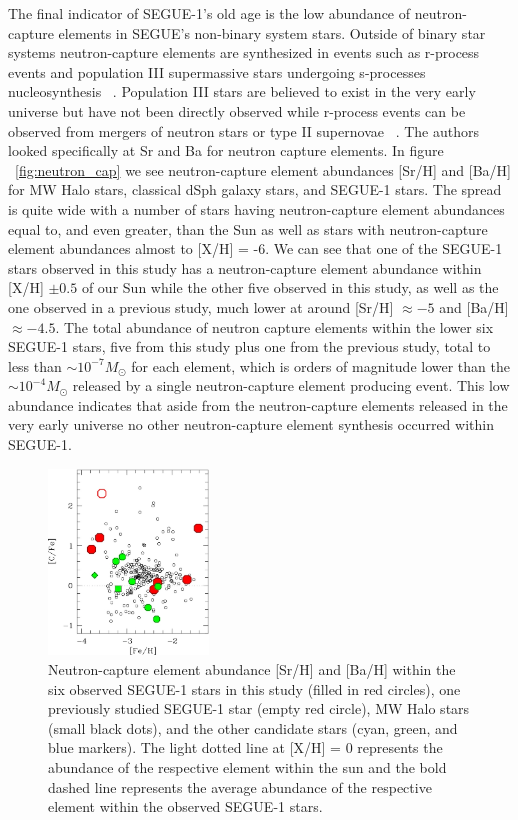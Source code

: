 \documentclass{aastex631}
\begin{document}
The final indicator of SEGUE-1's old age is the low abundance of neutron-capture elements in SEGUE's non-binary system stars.
Outside of binary star systems neutron-capture elements are synthesized in events such as r-process events and 
population III supermassive stars undergoing s-processes nucleosynthesis ~\cite{Truran2002}. Population III stars are believed to exist in the 
very early universe but have not been directly observed while r-process events can be observed from mergers of neutron stars or
type II supernovae ~\cite{Truran2002}. The authors looked specifically at Sr and Ba for neutron capture elements. In figure ~\ref{fig:neutron_cap} 
we see neutron-capture element abundances [Sr/H]
and [Ba/H] for MW Halo stars, classical dSph galaxy stars, and SEGUE-1 stars. The spread is quite wide with a number of stars having
neutron-capture element abundances equal to, and even greater, than the Sun as well as stars with neutron-capture element abundances
almost to [X/H] = -6. We can see that one of the SEGUE-1 stars observed in this study has a neutron-capture element abundance within
[X/H] $\pm 0.5$ of our Sun while the other five observed in this study, as well as the one observed in a previous study, much lower at
around [Sr/H] $\approx -5$ and [Ba/H] $\approx -4.5$. The total abundance of neutron capture elements within the lower six SEGUE-1 stars,
five from this study plus one from the previous study, total to less than \(\sim 10^{-7} M_{\odot}\) for each element, which is orders
of magnitude lower than the \(\sim 10^{-4} M_{\odot}\) released by a single neutron-capture element producing event. This low abundance
indicates that aside from the neutron-capture elements released in the very early universe no other neutron-capture element synthesis
occurred within SEGUE-1.

\begin{figure}
    \begin{center}
        \includegraphics[width=0.38\textwidth]{carbon.jpg}
    \end{center}
    \caption{Neutron-capture element abundance [Sr/H] and [Ba/H] within the six observed SEGUE-1 stars in this study 
    (filled in red circles), one previously studied SEGUE-1 star (empty red circle), MW Halo stars (small black dots),
    and the other candidate stars (cyan, green, and blue markers). The light dotted line at [X/H] = 0 represents the abundance
    of the respective element within the sun and the bold dashed line represents the average abundance of the respective element
    within the observed SEGUE-1 stars.}
    \label{fig:carbon}
\end{figure}
\end{document}
